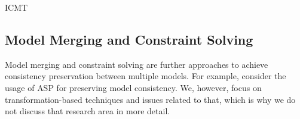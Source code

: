 \begin{copiedFrom}{ICMT}
\subsection*{Model Merging and Constraint Solving} 
Model merging and constraint solving are further approaches to achieve consistency preservation between multiple models.
For example, \textcite{eramo2008a} consider the usage of \gls{ASP} for preserving model consistency.
We, however, focus on transformation-based techniques and issues related to that,
which is why we do not discuss that research area in more detail.


\end{copiedFrom} %


